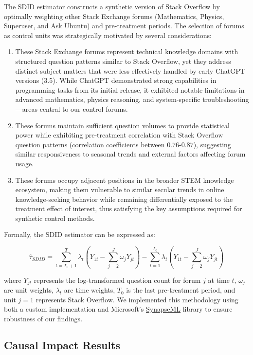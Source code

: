 The SDID estimator constructs a synthetic version of Stack Overflow by optimally weighting other Stack Exchange forums (Mathematics, Physics, Superuser, and Ask Ubuntu) and pre-treatment periods. The selection of forums as control units was strategically motivated by several considerations:
\begin{enumerate}
    \item These Stack Exchange forums represent technical knowledge domains with structured question patterns similar to Stack Overflow, yet they address distinct subject matters that were less effectively handled by early ChatGPT versions (3.5). While ChatGPT demonstrated strong capabilities in programming tasks from its initial release, it exhibited notable limitations in advanced mathematics, physics reasoning, and system-specific troubleshooting—areas central to our control forums. 
    \item These forums maintain sufficient question volumes to provide statistical power while exhibiting pre-treatment correlation with Stack Overflow question patterns (correlation coefficients between 0.76-0.87), suggesting similar responsiveness to seasonal trends and external factors affecting forum usage. 
    \item These forums occupy adjacent positions in the broader STEM knowledge ecosystem, making them vulnerable to similar secular trends in online knowledge-seeking behavior while remaining differentially exposed to the treatment effect of interest, thus satisfying the key assumptions required for synthetic control methods.
\end{enumerate}
Formally, the SDID estimator can be expressed as:

\begin{equation}
\hat{\tau}_{SDID} = \sum_{t=T_0+1}^T \lambda_t \left( Y_{1t} - \sum_{j=2}^J \omega_j Y_{jt} \right) - \sum_{t=1}^{T_0} \lambda_t \left( Y_{1t} - \sum_{j=2}^J \omega_j Y_{jt} \right)
\end{equation}

where $Y_{jt}$ represents the log-transformed question count for forum $j$ at time $t$, $\omega_j$ are unit weights, $\lambda_t$ are time weights, $T_0$ is the last pre-treatment period, and unit $j=1$ represents Stack Overflow. We implemented this methodology using both a custom implementation and Microsoft's \href{https://microsoft.github.io/SynapseML/docs/Overview/}{SynapseML} library to ensure robustness of our findings.

\subsection{Causal Impact Results}

